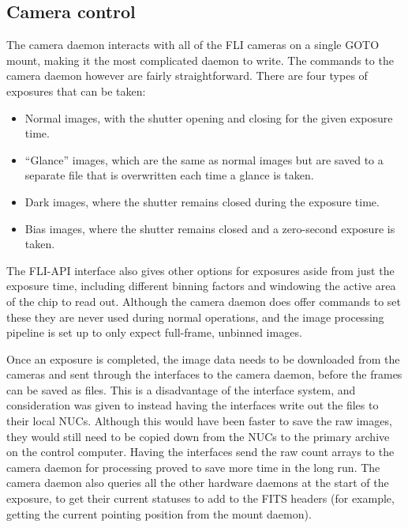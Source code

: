 \subsection{Camera control}
\label{sec:cam}
\begin{colsection}

The camera daemon interacts with all of the FLI cameras on a single GOTO mount, making it the most complicated daemon to write. The commands to the camera daemon however are fairly straightforward. There are four types of exposures that can be taken:

\begin{itemize}
    \item Normal images, with the shutter opening and closing for the given exposure time.
    \item ``Glance'' images, which are the same as normal images but are saved to a separate file that is overwritten each time a glance is taken.
    \item Dark images, where the shutter remains closed during the exposure time.
    \item Bias images, where the shutter remains closed and a zero-second exposure is taken.
\end{itemize}

The FLI-API interface also gives other options for exposures aside from just the exposure time, including different binning factors and windowing the active area of the chip to read out. Although the camera daemon does offer commands to set these they are never used during normal operations, and the image processing pipeline is set up to only expect full-frame, unbinned images.

Once an exposure is completed, the image data needs to be downloaded from the cameras and sent through the interfaces to the camera daemon, before the frames can be saved as  files. This is a disadvantage of the interface system, and consideration was given to instead having the interfaces write out the files to their local NUCs. Although this would have been faster to save the raw images, they would still need to be copied down from the NUCs to the primary archive on the control computer. Having the interfaces send the raw count arrays to the camera daemon for processing proved to save more time in the long run. The camera daemon also queries all the other hardware daemons at the start of the exposure, to get their current statuses to add to the FITS headers (for example, getting the current pointing position from the mount daemon).


\end{colsection}
